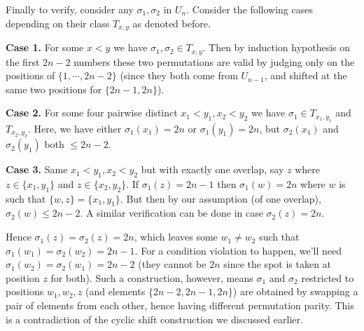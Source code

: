 \documentclass[11pt,a4paper]{article}
\begin{document}
\begin{enumerate}
        Finally to verify, consider any $\sigma_1, \sigma_2$ in $U_n$. Consider the following cases depending on their class $T_{x, y}$ as denoted before. 
        
        \textbf{Case 1.} For some $x < y$ we have $\sigma_1, \sigma_2\in T_{x, y}$. 
        Then by induction hypothesis on the first $2n-2$ numbers these two permutations are valid by judging only on the positions of $\{1, \cdots, 2n-2\}$ (since they both come from $U_{n-1}$, and shifted at the same two positions for $\{2n-1, 2n\}$). 
        
        \textbf{Case 2.} For some four pairwise distinct $x_1<y_1, x_2<y_2$ we have $\sigma_1\in T_{x_1, y_1}$ and $T_{x_2, y_2}$. 
        Here, we have either $\sigma_1(x_1)=2n$ or $\sigma_1(y_1)=2n$, but $\sigma_2(x_1)$ and $\sigma_2(y_1)$ both $\le 2n-2$. 
        
        \textbf{Case 3.} Same $x_1 < y_1, x_2 < y_2$ but with exactly one overlap, say $z$ where $z\in \{x_1, y_1\}$ and $z\in \{x_2, y_2\}$. 
        If $\sigma_1(z)=2n-1$ then $\sigma_1(w)=2n$ where $w$ is such that $\{w, z\}=\{x_1, y_1\}$. 
        But then by our assumption (of one overlap), $\sigma_2(w)\le 2n-2$. 
        A similar verification can be done in case $\sigma_2(z)=2n$. 
        
        Hence $\sigma_1(z)=\sigma_2(z)=2n$, which leaves some $w_1\neq w_2$ such that $\sigma_1(w_1)=\sigma_2(w_2)=2n-1$. For a condition violation to happen, 
        we'll need $\sigma_1(w_2)=\sigma_2(w_1)=2n-2$ (they cannot be $2n$ since the spot is taken at position $z$ for both). 
        Such a construction, however, means $\sigma_1$ and $\sigma_2$ restricted to positions $w_1, w_2, z$ (and elements $\{2n-2, 2n-1, 2n\}$) are obtained by swapping a pair of elements from each other, 
        hence having different permutation parity. 
        This is a contradiction of the cyclic shift construction we discussed earlier. 
	\end{enumerate}
	
	
\end{document}

